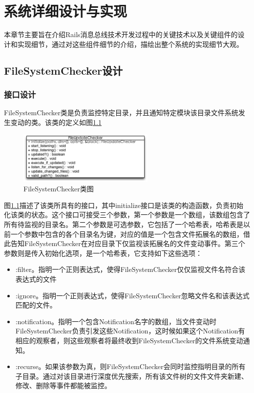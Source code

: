\chapter{系统详细设计与实现}

本章节主要旨在介绍Rails消息总线技术开发过程中的关键技术以及关键组件的设计和实现细节，通过对这些组件细节的介绍，描绘出整个系统的实现细节大观。

\section{FileSystemChecker设计}
\subsection{接口设计}
FileSystemChecker类是负责监控特定目录，并且通知特定模块该目录文件系统发生变动的类。该类的定义如图\ref{fig-fuc-class}

\begin{figure}[h]
\centering
\includegraphics[width=0.6\textwidth]{images/overview/file_update_checker_class.eps}
\caption{FileSystemChecker类图}
\label{fig-fuc-class}
\end{figure}

图\ref{fig-fuc-class}描述了该类所具有的接口，其中initialize接口是该类的构造函数，负责初始化该类的状态。这个接口可接受三个参数，第一个参数是一个数组，该数组包含了所有待监视的目录名。第二个参数是可选参数，它包括了一个哈希表，哈希表是以前一个参数中包含的各个目录名为键，对应的值是一个包含文件拓展名的数组，借此告知FileSystemChecker在对应目录下仅监视该拓展名的文件变动事件。第三个参数则是传入初始化选项，是一个哈希表，它支持如下这些选项：

\begin{itemize}
\item :filter。指明一个正则表达式，使得FileSystemChecker仅仅监视文件名符合该表达式的文件
\item :ignore。指明一个正则表达式，使得FileSystemChecker忽略文件名和该表达式匹配的文件。
\item :notification。指明一个包含Notification名字的数组，当文件变动时FileSystemChecker负责引发这些Notification，这时候如果这个Notification有相应的观察者，则这些观察者将最终收到FileSystemChecker的文件系统变动通知。
\item :recurse。如果该参数为真，则FileSystemChecker会同时监控指明目录的所有子目录。通过对该目录进行深度优先搜索，所有该文件树的文件文件夹新建、修改、删除等事件都能被监控。
\end{itemize}

